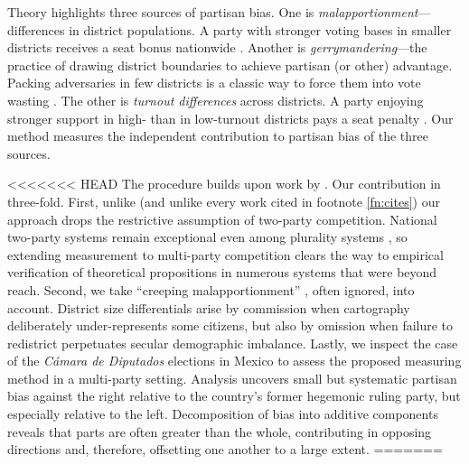 \documentclass[letter,12pt]{article}
\begin{document}
Theory highlights three sources of partisan bias. One is \emph{malapportionment}---differences in district populations. A party with stronger voting bases in smaller districts receives a seat bonus nationwide \citep{johnston.2002,jackmanMeasuringBias1994}. Another is \emph{gerrymandering}---the practice of drawing district boundaries to achieve partisan (or other) advantage. Packing adversaries in few districts is a classic way to force them into vote wasting \citep{cox.katz.2002,engstrom2006redisttrictApsr}. The other is \emph{turnout differences} across districts. A party enjoying stronger support in high- than in low-turnout districts pays a seat penalty \citep{campbellTurnoutBias1996,rosenstone.hansen.1993}. Our method measures the independent contribution to partisan bias of the three sources. 

<<<<<<< HEAD
The procedure builds upon work by \citet{grofman.etalBiasMalapp.1997}. Our contribution in three-fold. First, unlike \citeauthor{grofman.etalBiasMalapp.1997} (and unlike every work cited in footnote \ref{fn:cites}) our approach drops the restrictive assumption of two-party competition. National two-party systems remain exceptional even among plurality systems \citep{cox.1997}, so extending measurement to multi-party competition clears the way to empirical verification of theoretical propositions in numerous systems that were beyond reach. Second, we take ``creeping malapportionment'' \citep{johnston.2002}, often ignored, into account. District size differentials arise by commission when cartography deliberately under-represents some citizens, but also by omission when failure to redistrict perpetuates secular demographic imbalance. Lastly, we inspect the case of the \emph{C\'amara de Diputados} elections in Mexico to assess the proposed measuring method in a multi-party setting. Analysis uncovers small but systematic partisan bias against the right relative to the country's former hegemonic ruling party, but especially relative to the left. Decomposition of bias into additive components reveals that parts are often greater than the whole, contributing in opposing directions and, therefore, offsetting one another to a large extent. 
=======
\end{document}
